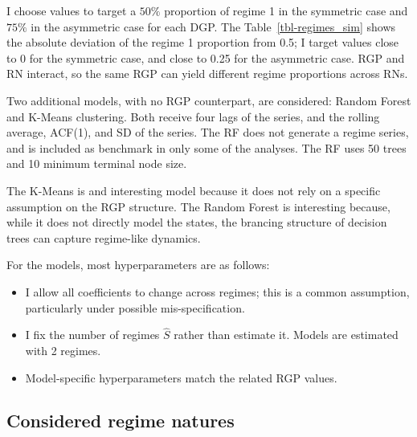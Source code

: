 \documentclass[
  letterpaper,
  DIV=11,
  numbers=noendperiod]{scrartcl}
\providecommand{\tightlist}{%
  \setlength{\itemsep}{0pt}\setlength{\parskip}{0pt}}\usepackage{longtable,booktabs,array}
\numberwithin{equation}{section}
\numberwithin{table}{section}
\numberwithin{figure}{section}
\begin{document}
I choose values to target a \(50\%\) proportion of regime 1 in the
symmetric case and \(75\%\) in the asymmetric case for each DGP. The
Table~\ref{tbl-regimes_sim} shows the absolute deviation of the regime 1
proportion from 0.5; I target values close to 0 for the symmetric case,
and close to 0.25 for the asymmetric case. RGP and RN interact, so the
same RGP can yield different regime proportions across RNs.

\begin{table}[!htbp]

\caption{\label{tbl-regimes_sim}Proportion of regimes across DGPs}

\centering{



}

\end{table}%

Two additional models, with no RGP counterpart, are considered: Random
Forest and K-Means clustering. Both receive four lags of the series, and
the rolling average, ACF(1), and SD of the series. The RF does not
generate a regime series, and is included as benchmark in only some of
the analyses. The RF uses 50 trees and 10 minimum terminal node size.

The K-Means is and interesting model because it does not rely on a
specific assumption on the RGP structure. The Random Forest is
interesting because, while it does not directly model the states, the
brancing structure of decision trees can capture regime-like dynamics.

For the models, most hyperparameters are as follows:

\begin{itemize}
\tightlist
\item
  I allow all coefficients to change across regimes; this is a common
  assumption, particularly under possible mis-specification.
\item
  I fix the number of regimes \(\hat{S}\) rather than estimate it.
  Models are estimated with 2 regimes.
\item
  Model-specific hyperparameters match the related RGP values.
\end{itemize}

\subsection{Considered regime natures}\label{sec-impl-rn}
\end{document}
